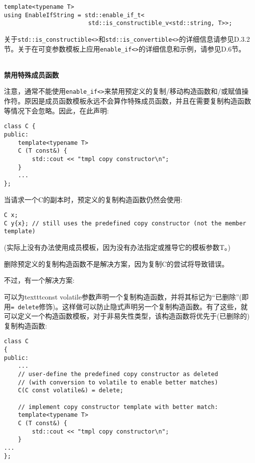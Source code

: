 \begin{lstlisting}[style=styleCXX]
template<typename T>
using EnableIfString = std::enable_if_t<
						std::is_constructible_v<std::string, T>>;
\end{lstlisting}

关于\texttt{std::is\_constructible<>}和\texttt{std::is\_convertible<>}的详细信息请参见D.3.2节。关于在可变参数模板上应用\texttt{enable\_if<>}的详细信息和示例，请参见D.6节。

\hspace*{\fill} \\ %
\noindent
\textbf{禁用特殊成员函数}

注意，通常不能使用\texttt{enable\_if<>}来禁用预定义的复制/移动构造函数和/或赋值操作符。原因是成员函数模板永远不会算作特殊成员函数，并且在需要复制构造函数等情况下会忽略。因此，在此声明:

\begin{lstlisting}[style=styleCXX]
class C {
public:
	template<typename T>
	C (T const&) {
		std::cout << "tmpl copy constructor\n";
	}
	...
};
\end{lstlisting}

当请求一个C的副本时，预定义的复制构造函数仍然会使用:

\begin{lstlisting}[style=styleCXX]
C x;
C y{x}; // still uses the predefined copy constructor (not the member template)
\end{lstlisting}

(实际上没有办法使用成员模板，因为没有办法指定或推导它的模板参数T。)

删除预定义的复制构造函数不是解决方案，因为复制C的尝试将导致错误。

不过，有一个解决方案:

可以为texttt{const volatile}参数声明一个复制构造函数，并将其标记为“已删除”(即用\texttt{= delete}修饰)。这样做可以防止隐式声明另一个复制构造函数。有了这些，就可以定义一个构造函数模板，对于非易失性类型，该构造函数将优先于(已删除的)复制构造函数:

\begin{lstlisting}[style=styleCXX]
class C
{
public:
	...
	// user-define the predefined copy constructor as deleted
	// (with conversion to volatile to enable better matches)
	C(C const volatile&) = delete;
	
	// implement copy constructor template with better match:
	template<typename T>
	C (T const&) {
		std::cout << "tmpl copy constructor\n";
	}
...
};
\end{lstlisting}

